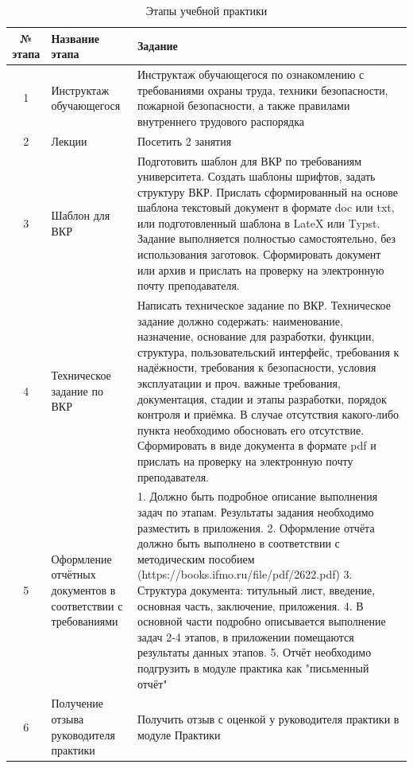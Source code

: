 \documentclass[a4paper,14pt]{extarticle}
\begin{document}
\begin{table}[H]
\caption{Этапы учебной практики}
\label{tab:stages}
\centering
\small
\begin{tabular}{|c|p{3.5cm}|p{9.5cm}|}
\hline
\textbf{№ этапа} & \textbf{Название этапа} & \textbf{Задание} \\ \hline
1 & Инструктаж обучающегося & Инструктаж обучающегося по ознакомлению с требованиями охраны труда, техники безопасности, пожарной безопасности, а также правилами внутреннего трудового распорядка \\ \hline
2 & Лекции & Посетить 2 занятия \\ \hline
3 & Шаблон для ВКР & Подготовить шаблон для ВКР по требованиям университета. Создать шаблоны шрифтов, задать структуру ВКР. Прислать сформированный на основе шаблона текстовый документ в формате doc или txt, или подготовленный шаблона в LateX или Typst. Задание выполняется полностью самостоятельно, без использования заготовок. Сформировать документ или архив и прислать на проверку на электронную почту преподавателя. \\ \hline
4 & Техническое задание по ВКР & Написать техническое задание по ВКР. Техническое задание должно содержать: наименование, назначение, основание для разработки, функции, структура, пользовательский интерфейс, требования к надёжности, требования к безопасности, условия эксплуатации и проч. важные требования, документация, стадии и этапы разработки, порядок контроля и приёмка. В случае отсутствия какого-либо пункта необходимо обосновать его отсутствие. Сформировать в виде документа в формате pdf и прислать на проверку на электронную почту преподавателя. \\ \hline
5 & Оформление отчётных документов в соответствии с требованиями & 1. Должно быть подробное описание выполнения задач по этапам. Результаты задания необходимо разместить в приложения. 2. Оформление отчёта должно быть выполнено в соответствии с методическим пособием (https://books.ifmo.ru/file/pdf/2622.pdf) 3. Структура документа: титульный лист, введение, основная часть, заключение, приложения. 4. В основной части подробно описывается выполнение задач 2-4 этапов, в приложении помещаются результаты данных этапов. 5. Отчёт необходимо подгрузить в модуле практика как "письменный отчёт" \\ \hline
6 & Получение отзыва руководителя практики & Получить отзыв с оценкой у руководителя практики в модуле Практики \\ \hline
\end{tabular}
\end{table}
\end{document}
